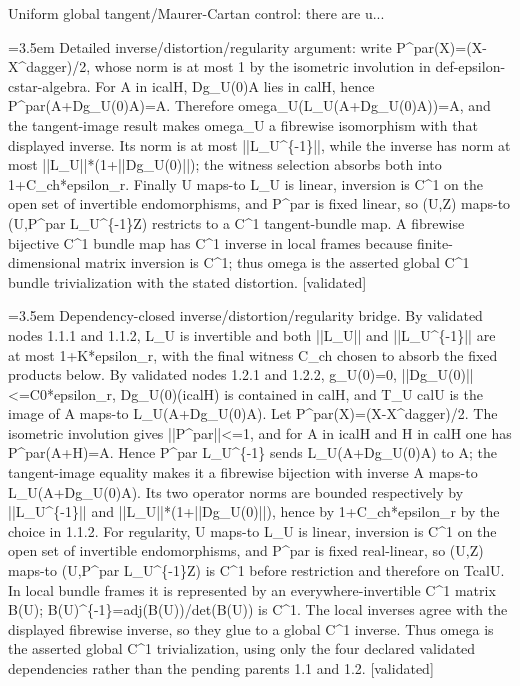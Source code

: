 \documentclass{article}
\newcommand{\step}[1]{\par\noindent\hangindent=3.5em\hangafter=1%
  \makebox[3.5em][l]{\textbf{#1.}}}
\newcommand{\steptag}[1]{\hfill{\small\textsf{[#1]}}}
\begin{document}
\begin{proofbox}{Uniform global tangent/Maurer-Cartan control: there are u...}
\step{1.3.1} Detailed inverse/distortion/regularity argument: write P\textasciicircum{}par(X)=(X-X\textasciicircum{}dagger)/2, whose norm is at most 1 by the isometric involution in def-epsilon-cstar-algebra. For A in icalH, Dg\_U(0)A lies in calH, hence P\textasciicircum{}par(A+Dg\_U(0)A)=A. Therefore omega\_U(L\_U(A+Dg\_U(0)A))=A, and the tangent-image result makes omega\_U a fibrewise isomorphism with that displayed inverse. Its norm is at most ||L\_U\textasciicircum{}\{-1\}||, while the inverse has norm at most ||L\_U||*(1+||Dg\_U(0)||); the witness selection absorbs both into 1+C\_ch*epsilon\_r. Finally U maps-to L\_U is linear, inversion is C\textasciicircum{}1 on the open set of invertible endomorphisms, and P\textasciicircum{}par is fixed linear, so (U,Z) maps-to (U,P\textasciicircum{}par L\_U\textasciicircum{}\{-1\}Z) restricts to a C\textasciicircum{}1 tangent-bundle map. A fibrewise bijective C\textasciicircum{}1 bundle map has C\textasciicircum{}1 inverse in local frames because finite-dimensional matrix inversion is C\textasciicircum{}1; thus omega is the asserted global C\textasciicircum{}1 bundle trivialization with the stated distortion. \steptag{validated} \\[6pt]
\step{1.3.1.1} Dependency-closed inverse/distortion/regularity bridge. By validated nodes 1.1.1 and 1.1.2, L\_U is invertible and both ||L\_U|| and ||L\_U\textasciicircum{}\{-1\}|| are at most 1+K*epsilon\_r, with the final witness C\_ch chosen to absorb the fixed products below. By validated nodes 1.2.1 and 1.2.2, g\_U(0)=0, ||Dg\_U(0)||<=C0*epsilon\_r, Dg\_U(0)(icalH) is contained in calH, and T\_U calU is the image of A maps-to L\_U(A+Dg\_U(0)A). Let P\textasciicircum{}par(X)=(X-X\textasciicircum{}dagger)/2. The isometric involution gives ||P\textasciicircum{}par||<=1, and for A in icalH and H in calH one has P\textasciicircum{}par(A+H)=A. Hence P\textasciicircum{}par L\_U\textasciicircum{}\{-1\} sends L\_U(A+Dg\_U(0)A) to A; the tangent-image equality makes it a fibrewise bijection with inverse A maps-to L\_U(A+Dg\_U(0)A). Its two operator norms are bounded respectively by ||L\_U\textasciicircum{}\{-1\}|| and ||L\_U||*(1+||Dg\_U(0)||), hence by 1+C\_ch*epsilon\_r by the choice in 1.1.2. For regularity, U maps-to L\_U is linear, inversion is C\textasciicircum{}1 on the open set of invertible endomorphisms, and P\textasciicircum{}par is fixed real-linear, so (U,Z) maps-to (U,P\textasciicircum{}par L\_U\textasciicircum{}\{-1\}Z) is C\textasciicircum{}1 before restriction and therefore on TcalU. In local bundle frames it is represented by an everywhere-invertible C\textasciicircum{}1 matrix B(U); B(U)\textasciicircum{}\{-1\}=adj(B(U))/det(B(U)) is C\textasciicircum{}1. The local inverses agree with the displayed fibrewise inverse, so they glue to a global C\textasciicircum{}1 inverse. Thus omega is the asserted global C\textasciicircum{}1 trivialization, using only the four declared validated dependencies rather than the pending parents 1.1 and 1.2. \steptag{validated} \\[4pt]

\end{proofbox}
\end{document}
